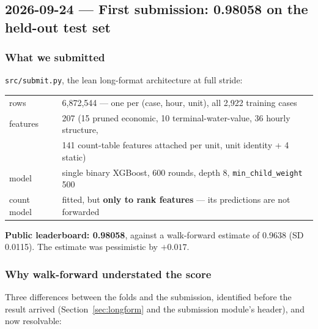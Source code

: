\subsection{2026-09-24 --- First submission: 0.98058 on the held-out test set}
\label{sec:submission}

\subsubsection*{What we submitted}

\texttt{src/submit.py}, the lean long-format architecture at full stride:

\begin{center}\small
\begin{tabular}{ll}
\toprule
rows & 6{,}872{,}544 --- one per (case, hour, unit), all 2{,}922 training cases \\
features & 207 (15 pruned economic, 10 terminal-water-value, 36 hourly structure, \\
         & 141 count-table features attached per unit, unit identity + 4 static) \\
model & single binary XGBoost, 600 rounds, depth 8, \texttt{min\_child\_weight} 500 \\
count model & fitted, but \textbf{only to rank features} --- its predictions are not forwarded \\
\bottomrule
\end{tabular}
\end{center}

\begin{finding}
\textbf{Public leaderboard: 0.98058}, against a walk-forward estimate of 0.9638 (SD 0.0115).
The estimate was pessimistic by $+0.017$.
\end{finding}

\subsubsection*{Why walk-forward understated the score}

Three differences between the folds and the submission, identified before the result arrived
(Section~\ref{sec:longform} and the submission module's header), and now resolvable:

